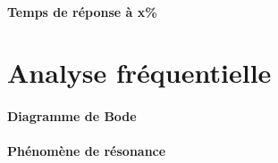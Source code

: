 \paragraph{Temps de réponse à x\%}
\begin{figure}[!hbt]
    \centering
    
\end{figure}
\clearpage
{\tikzset{external/export=false}

}
\section{Analyse fréquentielle}
\paragraph{Diagramme de Bode}
\begin{figure}[!h]
    \centering
    
\end{figure}
\paragraph{Phénomène de résonance}
\begin{figure}[!hb]
    \centering
    
\end{figure}
